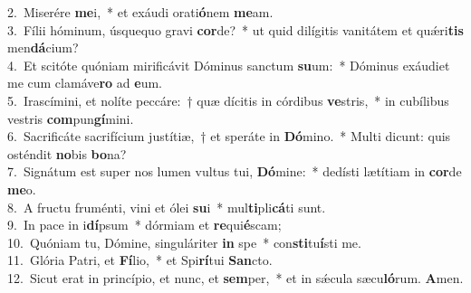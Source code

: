 {2.~}Miserére \textbf{me}i,~* et exáudi orati\textbf{ó}nem \textbf{me}am.\\
{3.~}Fílii hóminum, úsquequo gravi \textbf{cor}de?~* ut quid dilígitis vanitátem et quǽri\textbf{tis} men\textbf{dá}cium?\\
{4.~}Et scitóte quóniam mirificávit Dóminus sanctum \textbf{su}um:~* Dóminus exáudiet me cum clamáve\textbf{ro} ad \textbf{e}um.\\
{5.~}Irascímini, et nolíte peccáre:~† quæ dícitis in córdibus \textbf{ve}stris,~* in cubílibus vestris \textbf{com}pun\textbf{gí}mini.\\
{6.~}Sacrificáte sacrifícium justítiæ,~† et speráte in \textbf{Dó}mino.~* Multi dicunt: quis osténdit \textbf{no}bis \textbf{bo}na?\\
{7.~}Signátum est super nos lumen vultus tui, \textbf{Dó}mine:~* dedísti lætítiam in \textbf{cor}de \textbf{me}o.\\
{8.~}A fructu fruménti, vini et ólei \textbf{su}i~* mul\textbf{ti}pli\textbf{cá}ti sunt.\\
{9.~}In pace in i\textbf{dí}psum~* dórmiam et \textbf{re}qui\textbf{é}scam;\\
{10.~}Quóniam tu, Dómine, singuláriter \textbf{in} spe~* con\textbf{sti}tu\textbf{í}sti me.\\
{11.~}Glória Patri, et \textbf{Fí}lio,~* et Spi\textbf{rí}tui \textbf{San}cto.\\
{12.~}Sicut erat in princípio, et nunc, et \textbf{sem}per,~* et in sǽcula sæcu\textbf{ló}rum. \textbf{A}men.\\
